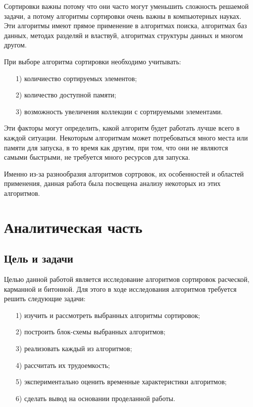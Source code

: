 \documentclass[12pt]{report}
\begin{document}
Сортировки важны потому что они часто могут уменьшить сложность решаемой задачи, а потому алгоритмы сортировки очень важны в компьютерных науках. Эти алгоритмы имеют прямое применение в алгоритмах поиска, алгоритмах баз данных, методах разделяй и властвуй, алгоритмах структуры данных и многом другом.\newline

При выборе алгоритма сортировки необходимо учитывать: 
\begin{enumerate}
	\item[1)] количиество сортируемых элементов;
	\item[2)] количество доступной памяти;
	\item[3)] возможность увеличения коллекции с сортируемыми элементами.
\end{enumerate}
  

Эти факторы могут определить, какой алгоритм будет работать лучше всего в каждой ситуации. Некоторым алгоритмам может потребоваться много места или памяти для запуска, в то время как другим, при том, что они не являются самыми быстрыми, не требуется много ресурсов для запуска.

Именно из-за разнообразия алгоритмов сортровок, их особенностей и областей применения, данная работа была посвещена анализу некоторых из этих алгоритмов.
	
	
	

	
	\chapter{Аналитическая часть}
	
	\section{Цель и задачи}
	
	Целью данной работой является исследование алгоритмов сортировок расческой, карманной и битонной. Для этого в ходе исследования алгоритмов требуется решить следующие задачи:
	\begin{enumerate}
		\item[1)] изучить и рассмотреть выбранных алгоритмы сортировок;
		\item[2)] построить блок-схемы выбранных алгоритмов;
		\item[3)] реализовать каждый из алгоритмов;
		\item[4)] рассчитать их трудоемкость;
		\item[5)] экспериментально оценить временные характеристики алгоритмов;
		\item[6)] сделать вывод на основании проделанной работы.
	\end{enumerate}
	
\end{document}
